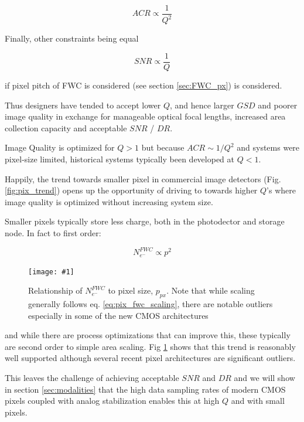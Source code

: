 \documentclass[10pt,journal]{IEEEtran}  %
\newcommand{\includefigure}[3]
{
  \begin{figure}[h!]
  \centering
  \texttt{[image: \#1]}
  \caption[]{#3}
  \label{#2}
  \end{figure}
}
\begin{document}
\begin{equation}
    ACR \propto \frac{1}{Q^2}
\end{equation}

Finally, other constraints being equal

\begin{equation}
    SNR \propto \frac{1}{Q}
\end{equation}

if pixel pitch of FWC is considered (see section \ref{sec:FWC_px}) is considered.

Thus designers have tended to accept lower $Q$, and hence larger $GSD$ and poorer image quality in exchange for manageable optical focal lengths, increased area collection capacity and acceptable $SNR$ / $DR$.

\begin{observation}[$Q > 1$]
Image Quality is optimized for $Q>1$ but because $ACR \sim 1/Q^2$ and systems were pixel-size limited, historical systems typically been developed at $Q<1$.
\end{observation}

Happily, the trend towards smaller pixel in commercial image detectors (Fig. \ref{fig:pix_trend}) opens up the opportunity of driving to towards higher $Q$'s where image quality is optimized without increasing system size.

Smaller pixels typically store less charge, both in the photodector and storage node. In fact to first order\cite{jerram}:

\begin{equation}
  \label{eq:pix_fwc_scaling}  
N_{e^-}^{FWC} \propto p^2
\end{equation}

\includefigure{figures/p_fwc.pgf}{fig:p_fwc}{Relationship of $N_{e^-}^{FWC}$ to pixel size, $p_{px}$.  Note that while scaling generally follows eq. \ref{eq:pix_fwc_scaling}, there are notable outliers especially in some of the new CMOS architectures}

and while there are process optimizations that can improve this, these typically are second order to simple area scaling.  Fig \ref{fig:p_fwc} shows that this trend is reasonably well supported although several recent pixel architectures are significant outliers.

This leaves the challenge of achieving acceptable $SNR$ and $DR$ and we will show in section \ref{sec:modalities} that the high data sampling rates of modern CMOS pixels coupled with analog stabilization enables this at high $Q$ and with small pixels.
\end{document}
